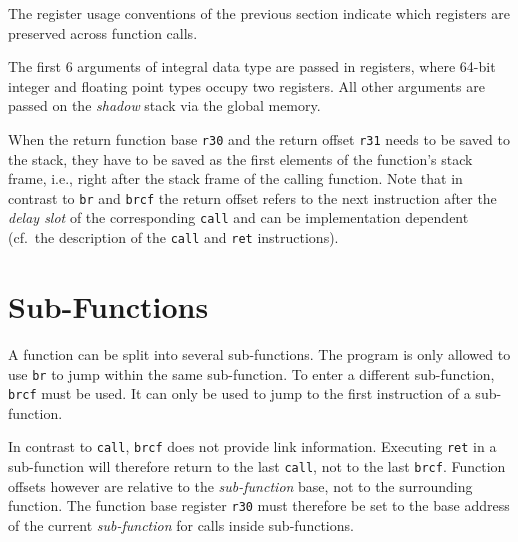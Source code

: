 \documentclass[a4paper,fontsize=10pt,twoside,DIV15,BCOR12mm,headinclude=true,footinclude=false,pagesize,bibtotoc]{scrbook}
\newcommand{\comment}[3]{

\textsf{\textbf{#1}} {\color{#3}#2}}
\newcommand{\martin}[1]{\comment{Martin}{#1}{Blue}}
\newcommand{\fb}[1]{\comment{Florian}{#1}{Emerald}}
\renewcommand{\martin}[1]{}
\renewcommand{\fb}[1]{}
\begin{document}
The register usage conventions of the previous section indicate which registers
are preserved across function calls.

The first $6$ arguments of integral data type are passed in registers, where
64-bit integer and floating point types occupy two registers. All other
arguments are passed on the \emph{shadow} stack via the global memory.

\fb{We could pass arguments via the stack cache, however, this would work only
for functions with a fixed number of arguments. The calling convention for
variadic function would then differ from the standard conventions. We should
probably also introduce a size limit on how many arguments should be passed via
the stack cache. Thus, for a first shot I decided to keep the conventions
simple.}
\martin{I would like to see arguments passed via the stack cache. No
reason to go via main memory (when the number is fixed.}

\martin{BTW: an on-chip stack, with single cycle access, is not so different from
a large register file. Maybe using a sliding window to keep the number of
addressing bits down. Shall we merge the stack cache with the register file?
Are we than redoing a stack (Java) processor?}

When the return function base \texttt{r30} and the return offset \texttt{r31}
needs to be saved to the stack, they have to be saved as the first elements
of the function's stack frame, i.e., right after the stack frame of the
calling function. Note that in contrast to \texttt{br} and \texttt{brcf} the
return offset refers to the next instruction after the \emph{delay slot} of the
corresponding \texttt{call} and can be implementation dependent (cf.\ the description
of the \texttt{call} and \texttt{ret} instructions).

\section{Sub-Functions}
A function can be split into several sub-functions. The program is only allowed to use
\texttt{br} to jump within the same sub-function. To enter a different sub-function,
\texttt{brcf} must be used. It can only be used to jump to the first instruction of a
sub-function.

In contrast to \texttt{call}, \texttt{brcf} does not provide link information.
Executing \texttt{ret} in a sub-function will therefore return to the last \texttt{call}, not to the last \texttt{brcf}.
Function offsets however are relative to the \emph{sub-function} base, not to the surrounding function.
The function base register \texttt{r30} must therefore be set to the base address
of the current \emph{sub-function} for calls inside sub-functions.
\end{document}
